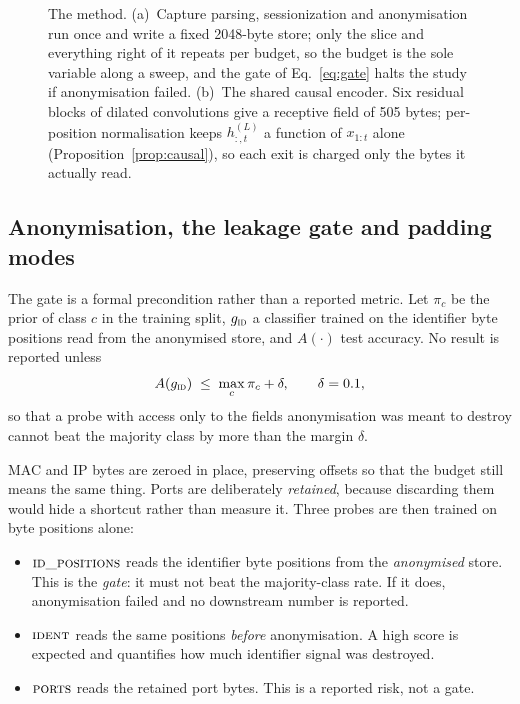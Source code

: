 \documentclass[pdflatex,sn-mathphys-num]{sn-jnl}
\theoremstyle{thmstyleone}%
\theoremstyle{thmstylethree}%
\begin{document}
\begin{figure}[tbp]
{}
\caption{The method. (a)~Capture parsing, sessionization and anonymisation run
once and write a fixed 2048-byte store; only the slice and everything right of
it repeats per budget, so the budget is the sole variable along a sweep, and
the gate of Eq.~\eqref{eq:gate} halts the study if anonymisation failed.
(b)~The shared causal encoder. Six residual blocks of dilated convolutions
give a receptive field of 505 bytes; per-position normalisation keeps
$h^{(L)}_{:,t}$ a function of $x_{1:t}$ alone (Proposition~\ref{prop:causal}),
so each exit is charged only the bytes it actually read.}\label{fig:arch}
\end{figure}

\subsection{Anonymisation, the leakage gate and padding modes}

The gate is a formal precondition rather than a reported metric. Let $\pi_c$
be the prior of class $c$ in the training split, $g_{\textsc{id}}$ a classifier
trained on the identifier byte positions read from the anonymised store, and
$A(\cdot)$ test accuracy. No result is reported unless
\begin{equation}
A(g_{\textsc{id}}) \;\le\; \max_{c} \pi_c + \delta,
\qquad \delta = 0.1,
\label{eq:gate}
\end{equation}
so that a probe with access only to the fields anonymisation was meant to
destroy cannot beat the majority class by more than the margin $\delta$.

MAC and IP bytes are zeroed in place, preserving offsets so that the budget
still means the same thing. Ports are deliberately \emph{retained}, because
discarding them would hide a shortcut rather than measure it. Three probes are
then trained on byte positions alone:

\begin{itemize}
\item $\textsc{id\_positions}$ reads the identifier byte positions from the
\emph{anonymised} store. This is the \emph{gate}: it must not beat the
majority-class rate. If it does, anonymisation failed and no downstream number
is reported.
\item $\textsc{ident}$ reads the same positions \emph{before} anonymisation. A
high score is expected and quantifies how much identifier signal was destroyed.
\item $\textsc{ports}$ reads the retained port bytes. This is a reported risk,
not a gate.
\end{itemize}
\end{document}
